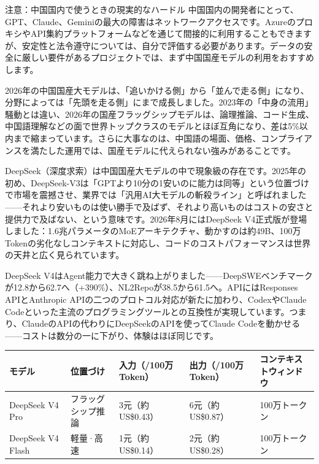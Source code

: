 \begin{tcbwarn}{注意：中国国内で使うときの現実的なハードル}
中国国内の開発者にとって、GPT、Claude、Geminiの最大の障害はネットワークアクセスです。AzureのプロキシやAPI集約プラットフォームなどを通じて間接的に利用することもできますが、安定性と法令遵守については、自分で評価する必要があります。データの安全に厳しい要件があるプロジェクトでは、まず中国国産モデルの利用をおすすめします。

\end{tcbwarn}


2026年の中国国産大モデルは、「追いかける側」から「並んで走る側」になり、分野によっては「先頭を走る側」にまで成長しました。2023年の「中身の流用」騒動とは違い、2026年の国産フラッグシップモデルは、論理推論、コード生成、中国語理解などの面で世界トップクラスのモデルとほぼ互角になり、差は5\%以内まで縮まっています。さらに大事なのは、中国語の場面、価格、コンプライアンスを満たした運用では、国産モデルに代えられない強みがあることです。


DeepSeek（深度求索）は中国国産大モデルの中で現象級の存在です。2025年の初め、DeepSeek-V3は「GPTより10分の1安いのに能力は同等」という位置づけで市場を震撼させ、業界では「汎用AI大モデルの斬殺ライン」と呼ばれました——それより安いものは使い勝手で及ばず、それより高いものはコストの安さと提供力で及ばない、という意味です。2026年8月にはDeepSeek V4正式版が登場しました：1.6兆パラメータのMoEアーキテクチャ、動かすのは約49B、100万Tokenの劣化なしコンテキストに対応し、コードのコストパフォーマンスは世界の天井と広く見られています。

DeepSeek V4はAgent能力で大きく跳ね上がりました——DeepSWEベンチマークが12.8から62.7へ（+390\%）、NL2Repoが38.5から61.5へ。APIにはResponses APIとAnthropic APIの二つのプロトコル対応が新たに加わり、CodexやClaude Codeといった主流のプログラミングツールとの互換性が実現しています。つまり、ClaudeのAPIの代わりにDeepSeekのAPIを使ってClaude Codeを動かせる——コストは数分の一に下がり、体験はほぼ同じです。

\begin{center}
\begin{tabularx}{\linewidth}{|X|X|X|X|X|}
\hline
\textbf{モデル} & \textbf{位置づけ} & \textbf{入力（/100万Token）} & \textbf{出力（/100万Token）} & \textbf{コンテキストウィンドウ} \tabularnewline
\hline
DeepSeek V4 Pro & フラッグシップ推論 & 3元（約US\$0.43） & 6元（約US\$0.87） & 100万トークン \tabularnewline
DeepSeek V4 Flash & 軽量·高速 & 1元（約US\$0.14） & 2元（約US\$0.28） & 100万トークン \tabularnewline
\hline
\end{tabularx}
\end{center}

